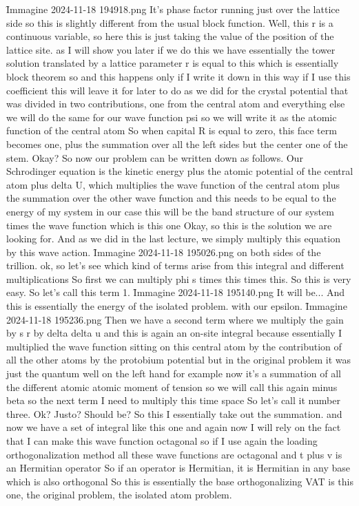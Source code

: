\f{Immagine 2024-11-18 194918.png}
It's phase factor running just over the lattice side so this is slightly different from the usual block function. Well, this r is a continuous variable, so here this is just taking the value of the position of the lattice site. as I will show you later if we do this we have essentially the tower solution translated by a lattice parameter r is equal to this which is essentially block theorem so and this happens only if I write it down in this way if I use this coefficient this will leave it for later to do as we did for the crystal potential that was divided in two contributions, one from the central atom and everything else we will do the same for our wave function psi so we will write it as the atomic function of the central atom So when capital R is equal to zero, this face term becomes one, plus the summation over all the left sides but the center one of the stem. Okay? So now our problem can be written down as follows. Our Schrodinger equation is the kinetic energy plus the atomic potential of the central atom plus delta U, which multiplies the wave function of the central atom plus the summation over the other wave function and this needs to be equal to the energy of my system in our case this will be the band structure of our system times the wave function which is this one Okay, so this is the solution we are looking for. And as we did in the last lecture, we simply multiply this equation by this wave action.
\f{Immagine 2024-11-18 195026.png}
on both sides of the trillion. ok, so let's see which kind of terms arise from this integral and different multiplications So first we can multiply phi s times this times this. So this is very easy. So let's call this term 1.
\f{Immagine 2024-11-18 195140.png}
It will be... And this is essentially the energy of the isolated problem. with our epsilon.
\f{Immagine 2024-11-18 195236.png}
Then we have a second term where we multiply the gain by s r by delta delta u and this is again an on-site integral because essentially I multiplied the wave function sitting on this central atom by the contribution of all the other atoms by the protobium potential but in the original problem it was just the quantum well on the left hand for example now it's a summation of all the different atomic atomic moment of tension so we will call this again minus beta so the next term I need to multiply this time space So let's call it number three. Ok? Justo? Should be? So this I essentially take out the summation. and now we have a set of integral like this one and again now I will rely on the fact that I can make this wave function octagonal so if I use again the loading orthogonalization method all these wave functions are octagonal and t plus v is an Hermitian operator So if an operator is Hermitian, it is Hermitian in any base which is also orthogonal So this is essentially the base orthogonalizing VAT is this one, the original problem, the isolated atom problem.
